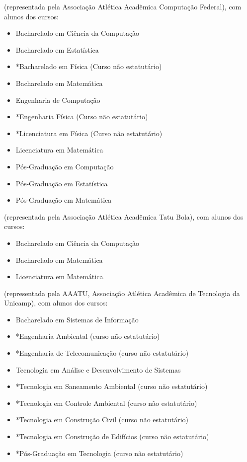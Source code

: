 \begin{article}
\begin{description}[noitemsep]
		\item[UFSCar] (representada pela Associação Atlética Acadêmica Computação Federal), com alunos dos cursos:
		\begin{itemize}[noitemsep]
			\item Bacharelado em Ciência da Computação
			\item Bacharelado em Estatística
			\item *Bacharelado em Física (Curso não estatutário)
			\item Bacharelado em Matemática
			\item Engenharia de Computação
			\item *Engenharia Física (Curso não estatutário)
			\item *Licenciatura em Física (Curso não estatutário)
			\item Licenciatura em Matemática
			\item Pós-Graduação em Computação
			\item Pós-Graduação em Estatística
			\item Pós-Graduação em Matemática
		\end{itemize}

		\item[UNESP - Rio Claro] (representada pela Associação Atlética Acadêmica Tatu Bola), com alunos dos cursos:
		\begin{itemize}[noitemsep]
			\item Bacharelado em Ciência da Computação
			\item Bacharelado em Matemática
			\item Licenciatura em Matemática
		\end{itemize}

		\item[UNICAMP - Limeira] (representada pela AAATU, Associação Atlética Acadêmica de Tecnologia da Unicamp), com alunos dos cursos:
		\begin{itemize}[noitemsep]
			\item Bacharelado em Sistemas de Informação
			\item *Engenharia Ambiental (curso não estatutário)
			\item *Engenharia de Telecomunicação (curso não estatutário)
			\item Tecnologia em Análise e Desenvolvimento de Sistemas
			\item *Tecnologia em Saneamento Ambiental (curso não estatutário)
			\item *Tecnologia em Controle Ambiental (curso não estatutário)
			\item *Tecnologia em Construção Civil (curso não estatutário)
			\item *Tecnologia em Construção de Edifícios (curso não estatutário)
			\item *Pós-Graduação em Tecnologia (curso não estatutário)
		\end{itemize}


\end{description}
\end{article}
